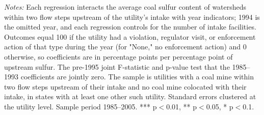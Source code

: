 \begin{table}[htbp]
\begin{minipage}{\linewidth}
\textit{Notes:} Each regression interacts the average coal sulfur content of watersheds within two flow steps upstream of the utility's intake with year indicators; 1994 is the omitted year, and each regression controls for the number of intake facilities. Outcomes equal 100 if the utility had a violation, regulator visit, or enforcement action of that type during the year (for "None," no enforcement action) and 0 otherwise, so coefficients are in percentage points per percentage point of upstream sulfur. The pre-1995 joint F-statistic and p-value test that the 1985--1993 coefficients are jointly zero. The sample is utilities with a coal mine within two flow steps upstream of their intake and no coal mine colocated with their intake, in states with at least one other such utility. Standard errors clustered at the utility level. Sample period 1985--2005. *** p$<$0.01, ** p$<$0.05, * p$<$0.1.
\end{minipage}
\end{table}
